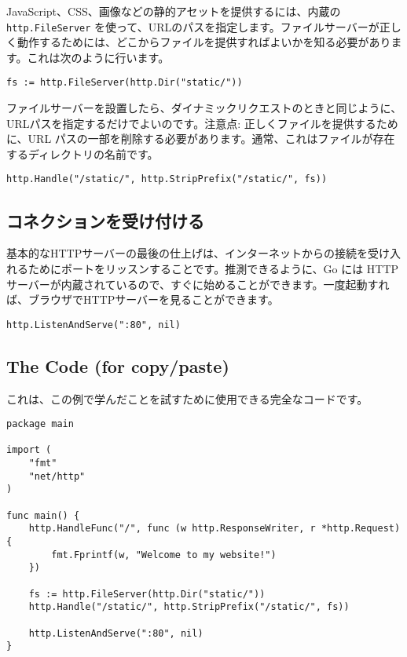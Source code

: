 JavaScript、CSS、画像などの静的アセットを提供するには、内蔵の \texttt{http.FileServer} を使って、URLのパスを指定します。ファイルサーバーが正しく動作するためには、どこからファイルを提供すればよいかを知る必要があります。これは次のように行います。

\begin{lstlisting}[numbers=none]
fs := http.FileServer(http.Dir("static/"))
\end{lstlisting}

ファイルサーバーを設置したら、ダイナミックリクエストのときと同じように、URLパスを指定するだけでよいのです。注意点: 正しくファイルを提供するために、URL パスの一部を削除する必要があります。通常、これはファイルが存在するディレクトリの名前です。


\begin{lstlisting}[numbers=none]
http.Handle("/static/", http.StripPrefix("/static/", fs))
\end{lstlisting}

\subsection{コネクションを受け付ける}

基本的なHTTPサーバーの最後の仕上げは、インターネットからの接続を受け入れるためにポートをリッスンすることです。推測できるように、Go には HTTP サーバーが内蔵されているので、すぐに始めることができます。一度起動すれば、ブラウザでHTTPサーバーを見ることができます。

\begin{lstlisting}[numbers=none]
http.ListenAndServe(":80", nil)
\end{lstlisting}

\subsection{The Code (for copy/paste)}

これは、この例で学んだことを試すために使用できる完全なコードです。

\begin{lstlisting}[numbers=none]
package main

import (
    "fmt"
    "net/http"
)

func main() {
    http.HandleFunc("/", func (w http.ResponseWriter, r *http.Request) {
        fmt.Fprintf(w, "Welcome to my website!")
    })

    fs := http.FileServer(http.Dir("static/"))
    http.Handle("/static/", http.StripPrefix("/static/", fs))

    http.ListenAndServe(":80", nil)
}
\end{lstlisting}





